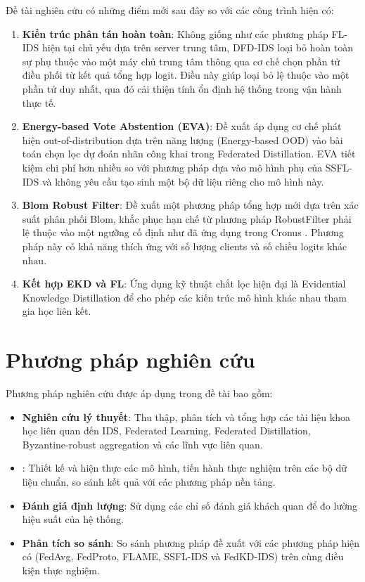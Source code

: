 Đề tài nghiên cứu có những điểm mới sau đây so với các công trình hiện có:

\begin{enumerate}
    \item \textbf{Kiến trúc phân tán hoàn toàn}: Không giống như các phương pháp FL-IDS hiện tại chủ yếu dựa trên server trung tâm, DFD-IDS loại bỏ hoàn toàn sự phụ thuộc vào một máy chủ trung tâm thông qua cơ chế chọn phần tử điều phối từ kết quả tổng hợp logit. Điều này giúp loại bỏ lệ thuộc vào một phần tử duy nhất, qua đó cải thiện tính ổn định hệ thống trong vận hành thực tế.
    \item \textbf{Energy-based Vote Abstention (EVA)}: Đề xuất áp dụng cơ chế phát hiện out-of-distribution dựa trên năng lượng (Energy-based OOD) vào bài toán chọn lọc dự đoán nhãn công khai trong Federated Distillation. EVA tiết kiệm chi phí hơn nhiều so với phương pháp dựa vào mô hình phụ của SSFL-IDS và không yêu cầu tạo sinh một bộ dữ liệu riêng cho mô hình này.
    \item \textbf{Blom Robust Filter}: Đề xuất một phương pháp tổng hợp mới dựa trên xác suất phân phối Blom, khắc phục hạn chế từ phương pháp RobustFilter phải lệ thuộc vào một ngưỡng cố định như đã ứng dụng trong Cronus \cite{chang2019cronus}. Phương pháp này có khả năng thích ứng với số lượng clients và số chiều logits khác nhau.
    \item \textbf{Kết hợp EKD và FL}: Ứng dụng kỹ thuật chắt lọc hiện đại là Evidential Knowledge Distillation để cho phép các kiến trúc mô hình khác nhau tham gia học liên kết.
\end{enumerate}

\section{Phương pháp nghiên cứu}
\label{sec:methodology}

Phương pháp nghiên cứu được áp dụng trong đề tài bao gồm:
\begin{itemize}
    \item \textbf{Nghiên cứu lý thuyết}: Thu thập, phân tích và tổng hợp các tài liệu khoa học liên quan đến IDS, Federated Learning, Federated Distillation, Byzantine-robust aggregation và các lĩnh vực liên quan.
    \item {}: Thiết kế và hiện thực các mô hình, tiến hành thực nghiệm trên các bộ dữ liệu chuẩn, so sánh kết quả với các phương pháp nền tảng.
    \item \textbf{Đánh giá định lượng}: Sử dụng các chỉ số đánh giá khách quan để đo lường hiệu suất của hệ thống.
    \item \textbf{Phân tích so sánh}: So sánh phương pháp đề xuất với các phương pháp hiện có (FedAvg, FedProto, FLAME, SSFL-IDS và FedKD-IDS) trên cùng điều kiện thực nghiệm.
\end{itemize}

